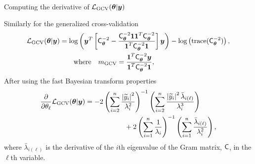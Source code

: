 \documentclass[handout, 10pt,compress,xcolor={usenames,dvipsnames}]{beamer} %
\newcommand{\bm}[1]{\boldsymbol{#1}}
\newcommand{\MLE}{\textup{EB}}
\newcommand{\GCV}{\textup{GCV}}
\renewcommand{\vtheta}{{\bm{\theta}}}
\def\abs#1{\ensuremath{\left \lvert #1 \right \rvert}}
\begin{document}
\begin{frame}{Computing the derivative of $\mathcal{L}_{\GCV}(\vtheta | \vy)$}
	
	
	Similarly for the generalized cross-validation
	\begin{align*}
	\mathcal{L}_{\GCV}(\vtheta | \vy) &= \log \left(  \vy^T \left[\mC^{-2}_\vtheta - \frac{\mC^{-2}_\vtheta \vone \vone^T \mC^{-2}_\vtheta}{\vone^T \mC^{-2}_\vtheta \vone}  \right] \vy \right)  
	- \log \left ( \trace(\mC^{-2}_\vtheta) \right ), 
	\\
	& \qquad \text{where} \quad m_{\GCV} = \frac{\vone^T \mC_\vtheta^{-2} \vy}{\vone^T \mC_\vtheta^{-2} \vone},
	\end{align*}
	After using the fast Bayesian transform properties
	\begin{align}
	\nonumber
	\frac{\partial}{\partial \theta_\ell}  \mathcal{L}_\GCV(\vtheta | \vy)
	& = -2 \left ( \sum_{i=2}^n \frac{\abs{\widetilde{y}_i}^2}{\lambda_i^2} \right)^{-1}
	\left ( \sum_{i=2}^n \frac{\abs{\widetilde{y}_i}^2 \bar{\lambda}_{i(\ell)} }{\lambda_i^3}    \right) \\
	\label{eqn:deriv_obj_func_full}	
	& \hspace{2cm}
	+ 2 \left( \sum_{i=1}^n \frac{1}{\lambda_i} \right)^{-1}
	\left( \sum_{i=1}^n \frac{\bar{\lambda}_{i(\ell)} }{\lambda_i^2}  \right),
	\end{align}
	where $\bar{\lambda}_{i(\ell)}$ is the derivative of the $i$th eigenvalue of the Gram matrix, $\mathsf{C}$, in the $\ell$th variable.
\end{frame}
\end{document}
